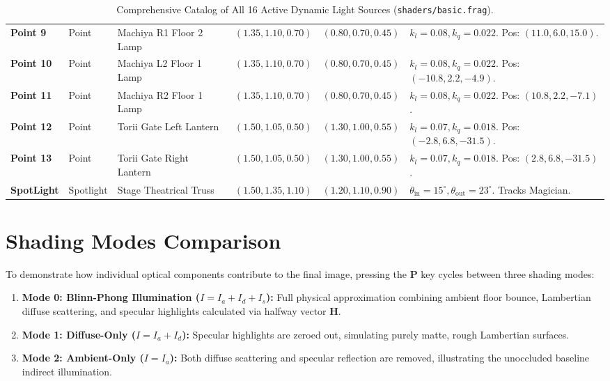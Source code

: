 \begin{table}[htbp]
\begin{tabularx}{\textwidth}{p{1.4cm} p{1.6cm} p{2.8cm} p{2.3cm} p{2.3cm} p{3.2cm}}
\addlinespace
\textbf{Point 9} & Point & Machiya R1 Floor 2 Lamp & $(1.35, 1.10, 0.70)$ & $(0.80, 0.70, 0.45)$ & $k_l = 0.08, k_q = 0.022$. Pos: $(11.0, 6.0, 15.0)$. \\
\addlinespace
\textbf{Point 10} & Point & Machiya L2 Floor 1 Lamp & $(1.35, 1.10, 0.70)$ & $(0.80, 0.70, 0.45)$ & $k_l = 0.08, k_q = 0.022$. Pos: $(-10.8, 2.2, -4.9)$. \\
\addlinespace
\textbf{Point 11} & Point & Machiya R2 Floor 1 Lamp & $(1.35, 1.10, 0.70)$ & $(0.80, 0.70, 0.45)$ & $k_l = 0.08, k_q = 0.022$. Pos: $(10.8, 2.2, -7.1)$. \\
\addlinespace
\textbf{Point 12} & Point & Torii Gate Left Lantern & $(1.50, 1.05, 0.50)$ & $(1.30, 1.00, 0.55)$ & $k_l = 0.07, k_q = 0.018$. Pos: $(-2.8, 6.8, -31.5)$. \\
\addlinespace
\textbf{Point 13} & Point & Torii Gate Right Lantern & $(1.50, 1.05, 0.50)$ & $(1.30, 1.00, 0.55)$ & $k_l = 0.07, k_q = 0.018$. Pos: $(2.8, 6.8, -31.5)$. \\
\addlinespace
\textbf{SpotLight} & Spotlight & Stage Theatrical Truss & $(1.50, 1.35, 1.10)$ & $(1.20, 1.10, 0.90)$ & $\theta_{\text{in}} = 15^\circ, \theta_{\text{out}} = 23^\circ$. Tracks Magician. \\
\bottomrule
\end{tabularx}
\caption{Comprehensive Catalog of All 16 Active Dynamic Light Sources (\texttt{shaders/basic.frag}).}
\label{tab:lights_catalog}
\end{table}

\section{Shading Modes Comparison}
To demonstrate how individual optical components contribute to the final image, pressing the \textbf{P} key cycles between three shading modes:
\begin{enumerate}
    \item \textbf{Mode 0: Blinn-Phong Illumination ($I = I_a + I_d + I_s$):} Full physical approximation combining ambient floor bounce, Lambertian diffuse scattering, and specular highlights calculated via halfway vector $\mathbf{H}$.
    \item \textbf{Mode 1: Diffuse-Only ($I = I_a + I_d$):} Specular highlights are zeroed out, simulating purely matte, rough Lambertian surfaces.
    \item \textbf{Mode 2: Ambient-Only ($I = I_a$):} Both diffuse scattering and specular reflection are removed, illustrating the unoccluded baseline indirect illumination.
\end{enumerate}

